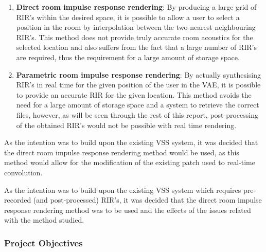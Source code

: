 \documentclass[../../main.tex]{subfiles}
\begin{document}
			\begin{enumerate}

			 \item \textbf{Direct room impulse response rendering}: By producing a large grid of \ac{RIR}'s within the desired space, it is possible to allow a user to select a position in the room by interpolation between the two nearest neighbouring \ac{RIR}'s. This method does not provide truly accurate room acoustics for the selected location and also suffers from the fact that a large number of \ac{RIR}'s are required, thus the requirement for a large amount of storage space.

			\item \textbf{Parametric room impulse response rendering}: By actually synthesising \ac{RIR}'s in real time for the given position of the user in the \ac{VAE}, it is possible to provide an accurate \ac{RIR} for the given location. This method avoids the need for a large amount of storage space and a system to retrieve the correct files, however, as will be seen through the rest of this report, post-processing of the obtained {RIR}'s would not be possible with real time rendering.
			\end{enumerate}

			As the intention was to build upon the existing \ac{VSS} system, it was decided that the direct room impulse response rendering method would be used, as this method would allow for the modification of the existing patch used to real-time convolution.

			As the intention was to build upon the existing \ac{VSS} system which requires pre-recorded (and post-processed) \ac{RIR}'s, it was decided that the direct room impulse response rendering method was to be used and the effects of the issues related with the method studied.



		\subsubsection{Project Objectives}
\end{document}
